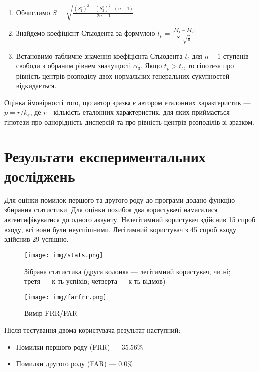 \documentclass{dstu}
\begin{document}
\begin{enumerate}
	\item Обчислимо $S = \sqrt{ \frac{(S^2_1)^2 + (S^2_2)^2 \cdot (n-1)}{2n-1} }$ 
	\item Знайдемо коефіцієнт Стьюдента за формулою $t_p = \frac{|M_1 - M_2|}{S \cdot \sqrt{\frac{2}{n}}}$
	\item Встановимо табличне значення коефіцієнта Стьюдента $t_t$ для $n-1$ ступенів свободи з обраним рівнем значущості $\alpha_3$.
	Якщо $t_p > t_t$, то гіпотеза про рівність центрів розподілу двох 
	нормальних генеральних сукупностей відкидається.
\end{enumerate}

Оцінка ймовірності того, що автор зразка є автором еталонних характеристик —
$p = r / k_e$, де $r$ - кількість еталонних характеристик, для яких приймається
гіпотези про однорідність дисперсій та про рівність центрів розподілів зі зразком.

\chapter{Результати експериментальних досліджень}

Для оцінки помилок першого та другого роду до програми додано функцію збирання статистики.
Для оцінки похибок два користувачі намагалися автентифікуватися до одного акаунту.
Нелегітимний користувач здійснив 15 спроб входу, всі вони були неуспішними.
Легітимний користувач з 45 спроб входу здійснив 29 успішно.

\begin{figure}[!htp]
	\centering
	\texttt{[image: img/stats.png]}
	\caption{Зібрана статистика (друга колонка — легітимний користувач, чи ні; третя — к-ть успіхів; четверта — к-ть відмов)}
	\label{fig:figure1}
\end{figure}

\begin{figure}[!htp]
	\centering
	\texttt{[image: img/farfrr.png]}
	\caption{Вимір FRR/FAR}
	\label{fig:figure2}
\end{figure}

Після тестування двома користувача результат наступний:

\begin{itemize}
	\item Помилки першого роду (FRR) — 35.56\%
	\item Помилки другого роду (FAR) — 0.0\%
\end{itemize}
\end{document}
